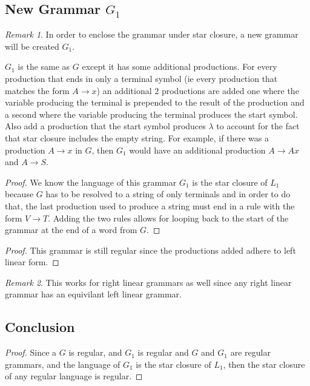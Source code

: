 \documentclass{assignment-x}
\theoremstyle{definition}
\theoremstyle{remark}
\newtheorem*{remark}{Remark}
\newenvironment{example}[1][Example]{\begin{trivlist}
    \item[\hskip \labelsep {\bfseries #1}]}{\end{trivlist}}
\begin{document}
\subsection{New Grammar $G_1$}
\begin{remark}
    In order to enclose the grammar under star closure, a new grammar will be created $G_1$. 
\end{remark}
\begin{example}
    $G_1$ is the same as $G$ except it has some additional productions. For every production that ends in only a terminal symbol (ie every production that matches the form $A \rightarrow x$) an additional 2 productions are added one where the variable producing the terminal is prepended to the result of the production and a second where the variable producing the terminal produces the start symbol. Also add a production that the start symbol produces $\lambda$ to account for the fact that star closure includes the empty string.
    For example, if there was a production $A \rightarrow x$  in $G$, then $G_1$ would have an additional production $A \rightarrow Ax$ and $A \rightarrow S$.
\end{example}
\begin{proof}
    We know the language of this grammar $G_1$ is the star closure of $L_1$ because $G$ has to be resolved to a string of only terminals and in order to do that, the last production used to produce a string must end in a rule with the form $V \rightarrow T$. Adding the two rules allows for looping back to the start of the grammar at the end of a word from $G$.
\end{proof}
\begin{proof}
    This grammar is still regular since the productions added adhere to left linear form.
\end{proof}
\begin{remark}
    This works for right linear grammars as well since any right linear grammar has an equivilant left linear grammar.
\end{remark}

\subsection{Conclusion}
\begin{proof}
    Since a $G$ is regular, and $G_1$ is regular and $G$ and $G_1$ are regular grammars, and the language of $G_1$ is the star closure of $L_1$, then the star closure of any regular language is regular.   
\end{proof}
\end{document}
